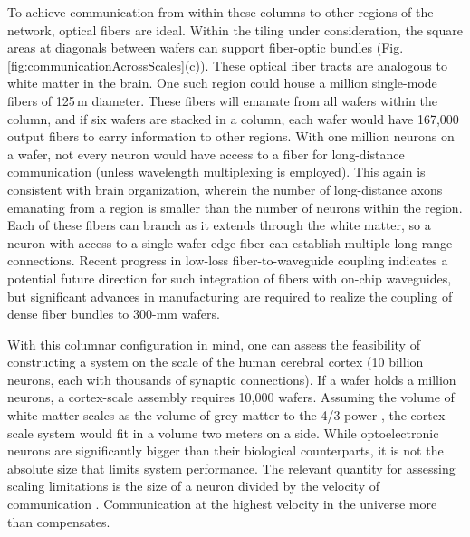 \documentclass[twocolumn]{article}
\begin{document}
To achieve communication from within these columns to other regions of the network, optical fibers are ideal. Within the tiling under consideration, the square areas at diagonals between wafers can support fiber-optic bundles (Fig.\,\ref{fig:communicationAcrossScales}(c)). These optical fiber tracts are analogous to white matter in the brain. One such region could house a million single-mode fibers of 125\,\textmu m diameter. These fibers will emanate from all wafers within the column, and if six wafers are stacked in a column, each wafer would have 167,000 output fibers to carry information to other regions. With one million neurons on a wafer, not every neuron would have access to a fiber for long-distance communication (unless wavelength multiplexing is employed). This again is consistent with brain organization, wherein the number of long-distance axons emanating from a region is smaller than the number of neurons within the region. Each of these fibers can branch as it extends through the white matter, so a neuron with access to a single wafer-edge fiber can establish multiple long-range connections. Recent progress in low-loss fiber-to-waveguide coupling \cite{khbu2020} indicates a potential future direction for such integration of fibers with on-chip waveguides, but significant advances in manufacturing are required to realize the coupling of dense fiber bundles to 300-mm wafers.

With this columnar configuration in mind, one can assess the feasibility of constructing a system on the scale of the human cerebral cortex (10 billion neurons, each with thousands of synaptic connections). If a wafer holds a million neurons, a cortex-scale assembly requires 10,000 wafers. Assuming the volume of white matter scales as the volume of grey matter to the 4/3 power \cite{zhse2000}, the cortex-scale system would fit in a volume two meters on a side. While optoelectronic neurons are significantly bigger than their biological counterparts, it is not the absolute size that limits system performance. The relevant quantity for assessing scaling limitations is the size of a neuron divided by the velocity of communication \cite{sh2019}. Communication at the highest velocity in the universe more than compensates. 
\end{document}
